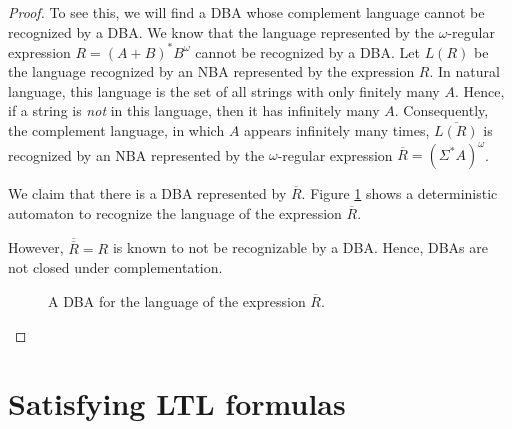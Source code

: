 \documentclass[letterpaper,11pt]{article}
\newcommand{\question}{\section}
\renewcommand{\complement}{\overline}
\begin{document}
\begin{proof}
    To see this, we will find a DBA whose complement language cannot be
    recognized by a DBA. We know that the language represented by the
    $\omega$-regular expression $R = (A + B)^* B^\omega$ cannot be recognized
    by a DBA. Let $L(R)$ be the language recognized by an NBA represented by
    the expression $R$. In natural language, this language is the set of all
    strings with only finitely many $A$. Hence, if a string is \emph{not} in
    this language, then it has infinitely many $A$. Consequently, the
    complement language, in which $A$ appears infinitely many times,
    $\complement{L(R)}$ is recognized by an NBA represented by the
    $\omega$-regular expression $\complement{R} = (\Sigma^* A)^\omega$.

    We claim that there is a DBA represented by $\complement{R}$. Figure
    \ref{fig:dba} shows a deterministic automaton to recognize the language of
    the expression $\complement{R}$.

    However, $\complement{\complement{R}} = R$ is known to not be recognizable
    by a DBA. Hence, DBAs are not closed under complementation.

    \begin{figure}[ht]
        \begin{center}
        \end{center}
        \caption{
            A DBA for the language of the expression $\complement{R}$.
        }
        \label{fig:dba}
    \end{figure}
\end{proof}

\question{Satisfying LTL formulas}
\end{document}
